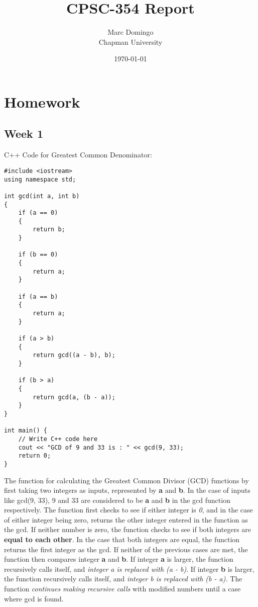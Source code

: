 \documentclass{article}
\title{CPSC-354 Report}
\author{Marc Domingo  \\ Chapman University}
\date{\today}
\theoremstyle{theorem}
\theoremstyle{definition}
\theoremstyle{remark}
\begin{document}
\maketitle
\section{Homework}\label{homework}
\subsection{Week 1}

C++ Code for Greatest Common Denominator:
\begin{lstlisting}
#include <iostream>
using namespace std;

int gcd(int a, int b)
{
    if (a == 0)
    {
        return b;
    }
    
    if (b == 0)
    {
        return a;
    }
    
    if (a == b)
    {
        return a;
    }
    
    if (a > b)
    {
        return gcd((a - b), b);
    }
    
    if (b > a)
    {
        return gcd(a, (b - a));
    }
}

int main() {
    // Write C++ code here
    cout << "GCD of 9 and 33 is : " << gcd(9, 33);
    return 0;
}
\end{lstlisting}
    
    The function for calculating the Greatest Common Divisor (GCD) functions by first taking two integers as inputs, represented by \textbf{a} and \textbf{b}. In the case of inputs like gcd(9, 33), 9 and 33 are considered to be \textbf{a} and \textbf{b} in the gcd function respectively. The function first checks to see if either integer is \textit{0}, and in the case of either integer being zero, returns the other integer entered in the function as the gcd. If neither number is zero, the function checks to see if both integers are \textbf{equal to each other}. In the case that both integers are equal, the function returns the first integer as the gcd. If neither of the previous cases are met, the function then compares integer \textbf{a} and \textbf{b}. If integer \textbf{a} is larger, the function recursively calls itself, and \textit{integer a is replaced with (a - b)}. If integer \textbf{b} is larger, the function recursively calls itself, and \textit{integer b is replaced with (b - a).} The function \textit{continues making recursive calls} with modified numbers until a case where gcd is found.
\end{document}

